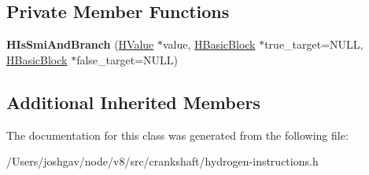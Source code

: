 \subsection*{Private Member Functions}
\begin{DoxyCompactItemize}
\item 
{\bfseries H\+Is\+Smi\+And\+Branch} (\hyperlink{classv8_1_1internal_1_1_h_value}{H\+Value} $\ast$value, \hyperlink{classv8_1_1internal_1_1_h_basic_block}{H\+Basic\+Block} $\ast$true\+\_\+target=N\+U\+LL, \hyperlink{classv8_1_1internal_1_1_h_basic_block}{H\+Basic\+Block} $\ast$false\+\_\+target=N\+U\+LL)\hypertarget{classv8_1_1internal_1_1_h_is_smi_and_branch_a1cdfd2990c3c1fc0defbff69986f21f1}{}\label{classv8_1_1internal_1_1_h_is_smi_and_branch_a1cdfd2990c3c1fc0defbff69986f21f1}

\end{DoxyCompactItemize}
\subsection*{Additional Inherited Members}


The documentation for this class was generated from the following file\+:\begin{DoxyCompactItemize}
\item 
/\+Users/joshgav/node/v8/src/crankshaft/hydrogen-\/instructions.\+h\end{DoxyCompactItemize}
